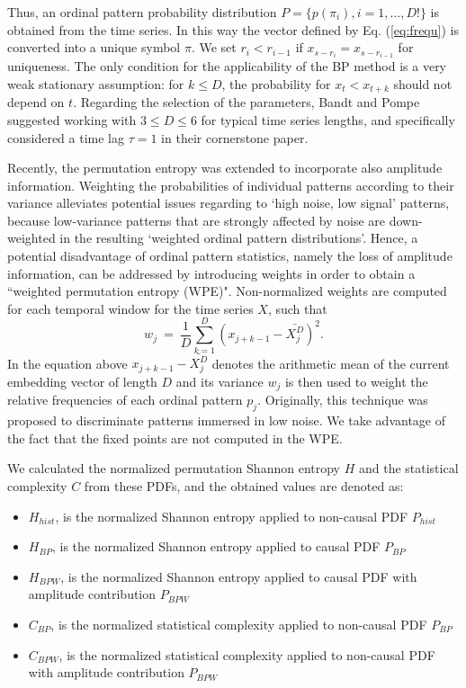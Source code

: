 Thus, an ordinal pattern probability distribution $P = \{ p(\pi_i), i = 1, \dots, D! \}$ is obtained from the time series.
In this way the vector defined by Eq. (\ref{eq:frequ}) is converted into a unique symbol $\pi$.
We set $r_i < r_{i-1}$ if $x_{s-r_{i}} = x_{s-r_{i-1}}$ for uniqueness.
The only condition for the applicability of the BP method is a very weak stationary assumption: for $k \leq D$, the probability for $x_t < x_{t+k}$ should not depend on $t$.
Regarding the selection of the parameters, Bandt and Pompe suggested working with $3 \leq D \leq 6$ for typical time series lengths, and specifically considered a time lag $\tau = 1$ in their cornerstone paper.

Recently, the permutation entropy was extended to incorporate also amplitude information.
Weighting the probabilities of individual patterns according to their variance alleviates potential issues regarding to ‘high noise, low signal’ patterns, because low-variance patterns that are strongly affected by noise are down-weighted in the resulting ‘weighted ordinal pattern distributions’.
Hence, a potential disadvantage of ordinal pattern statistics, namely the loss of amplitude information, can be addressed by introducing weights in order to obtain a ``weighted permutation entropy (WPE)".
Non-normalized weights are computed for each temporal window for the time series $X$, such that
\begin{equation}
\label{WPE_weigth}
w_j~=~\frac{1}{D}\sum_{k=1}^{D} \left(x_{j+k-1}-\bar{X_j^D}\right)^2.
\end{equation}
In the equation above $x_{j+k-1}-\bar{X_j^D}$ denotes the arithmetic mean of the current embedding vector of length $D$ and its variance $w_j$ is then used to weight the relative frequencies of each ordinal pattern $p_j$.
Originally, this technique was proposed to discriminate patterns immersed in low noise.
We take advantage of the fact that the fixed points are not computed in the WPE.

We calculated the normalized permutation Shannon entropy $H$ and the statistical complexity $C$ from these PDFs, and the obtained values are denoted as:
\begin{itemize}
	\item $H_{hist}$, is the normalized Shannon entropy applied to non-causal PDF $P_{hist}$
	\item $H_{BP}$, is the normalized Shannon entropy applied to causal PDF $P_{BP}$
	\item $H_{BPW}$, is the normalized Shannon entropy applied to causal PDF with amplitude contribution $P_{BPW}$
	\item $C_{BP}$, is the normalized statistical complexity applied to non-causal PDF $P_{BP}$
	\item $C_{BPW}$, is the normalized statistical complexity applied to non-causal PDF with amplitude contribution $P_{BPW} $
\end{itemize}

